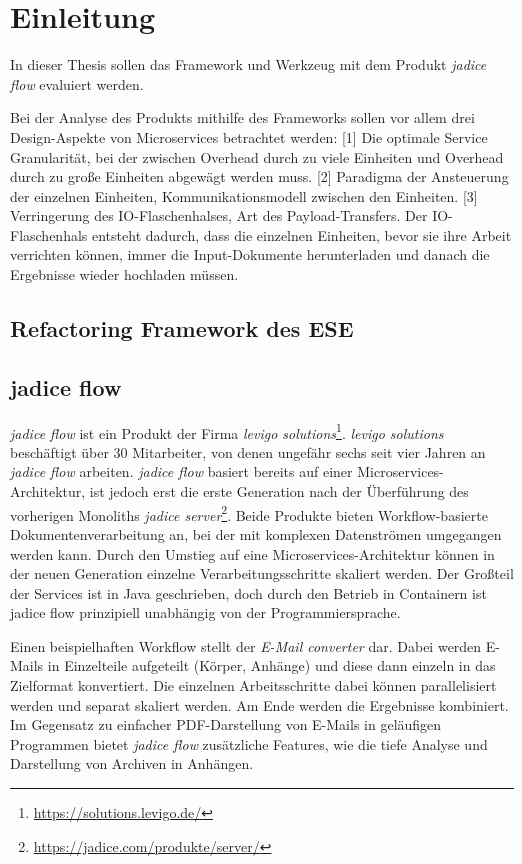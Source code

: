 \chapter{Einleitung}

In dieser Thesis sollen das Framework und Werkzeug mit dem Produkt \emph{jadice flow} evaluiert werden.

Bei der Analyse des Produkts mithilfe des Frameworks sollen vor allem drei Design-Aspekte von Microservices betrachtet werden: 
[1] Die optimale Service Granularität, bei der zwischen Overhead durch zu viele Einheiten und Overhead durch zu große Einheiten abgewägt werden muss. 
[2] Paradigma der Ansteuerung der einzelnen Einheiten, Kommunikationsmodell zwischen den Einheiten. 
[3] Verringerung des IO-Flaschenhalses, Art des Payload-Transfers. 
Der IO-Flaschenhals entsteht dadurch, dass die einzelnen Einheiten, bevor sie ihre Arbeit verrichten können, immer die Input-Dokumente herunterladen und danach die Ergebnisse wieder hochladen müssen.

\section{Refactoring Framework des ESE}
\section{jadice flow}

\emph{jadice flow} ist ein Produkt der Firma \emph{levigo solutions}\footnote{\url{https://solutions.levigo.de/}}.
\emph{levigo solutions} beschäftigt über 30 Mitarbeiter, von denen ungefähr sechs seit vier Jahren an \emph{jadice flow} arbeiten.
\emph{jadice flow} basiert bereits auf einer Microservices-Architektur, ist jedoch erst die erste Generation nach der Überführung des vorherigen Monoliths \emph{jadice server}\footnote{\url{https://jadice.com/produkte/server/}}.
Beide Produkte bieten Workflow-basierte Dokumentenverarbeitung an, bei der mit komplexen Datenströmen umgegangen werden kann.
Durch den Umstieg auf eine Microservices-Architektur können in der neuen Generation einzelne Verarbeitungsschritte skaliert werden.
Der Großteil der Services ist in Java geschrieben, doch durch den Betrieb in Containern ist jadice flow prinzipiell unabhängig von der Programmiersprache.

Einen beispielhaften Workflow stellt der \emph{E-Mail converter} dar. 
Dabei werden E-Mails in Einzelteile aufgeteilt (Körper, Anhänge) und diese dann einzeln in das Zielformat konvertiert. 
Die einzelnen Arbeitsschritte dabei können parallelisiert werden und separat skaliert werden. 
Am Ende werden die Ergebnisse kombiniert. 
Im Gegensatz zu einfacher PDF-Darstellung von E-Mails in geläufigen Programmen bietet \emph{jadice flow} zusätzliche Features, wie die tiefe Analyse und Darstellung von Archiven in Anhängen.

